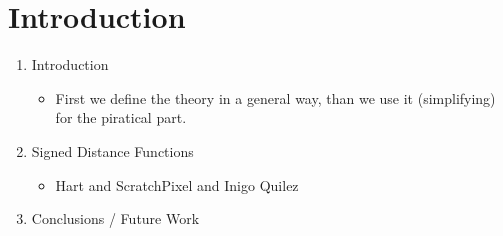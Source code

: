 
\section{Introduction}
\begin{enumerate}
  \item Introduction
    \begin{itemize}
      \item First we define the theory in a general way, than we use it (simplifying) for the piratical part.
    \end{itemize}

  \item Signed Distance Functions
    \begin{itemize}
      \item Hart and ScratchPixel and Inigo Quilez
    \end{itemize}

  

  \item Conclusions / Future Work


\end{enumerate}
